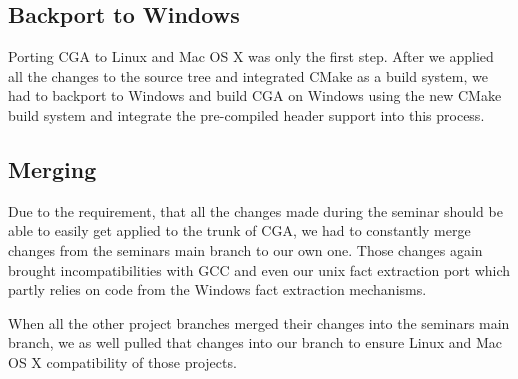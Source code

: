 \subsection{Backport to Windows}

Porting CGA to Linux and Mac OS X was only the first step. After we applied all the changes to the source tree and integrated CMake as a build system, we had to backport to Windows and build CGA on Windows using the new CMake build system  and integrate the pre-compiled header support into this process.

\subsection{Merging}

Due to the requirement, that all the changes made during the seminar should be able to easily get applied to the trunk of CGA, we had to constantly  merge changes from the seminars main branch to our own one. Those changes again brought incompatibilities with GCC and even our unix fact extraction port which partly relies on code from the Windows fact extraction mechanisms.

When all the other project branches merged their changes into the seminars main branch, we as well pulled that changes into our branch to ensure Linux and Mac OS X compatibility of those projects.
